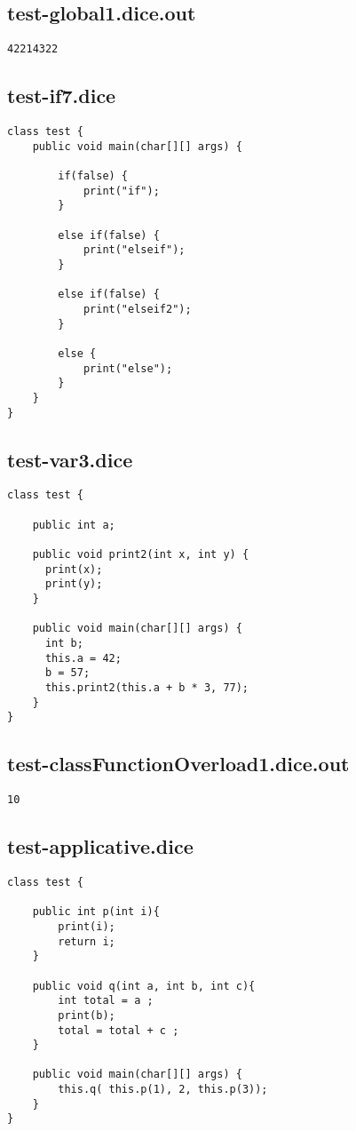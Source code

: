 \subsection{test-global1.dice.out}
\begin{verbatim}
42214322
\end{verbatim}
\pagebreak
\subsection{test-if7.dice}
\begin{verbatim}
class test {
	public void main(char[][] args) {

		if(false) { 
			print("if");
		} 
		
		else if(false) { 
			print("elseif"); 
		}

		else if(false) {
			print("elseif2");
		}

		else {
			print("else");
		}
	}
}
\end{verbatim}
\pagebreak
\subsection{test-var3.dice}
\begin{verbatim}
class test {

	public int a;

	public void print2(int x, int y) {
	  print(x);
	  print(y);
	}

	public void main(char[][] args) {
	  int b;
	  this.a = 42;
	  b = 57;
	  this.print2(this.a + b * 3, 77);
	}
}
\end{verbatim}
\pagebreak
\subsection{test-classFunctionOverload1.dice.out}
\begin{verbatim}
10
\end{verbatim}
\pagebreak
\subsection{test-applicative.dice}
\begin{verbatim}
class test {
	
	public int p(int i){ 
		print(i); 
		return i; 
	}

	public void q(int a, int b, int c){ 
		int total = a ; 
		print(b); 
		total = total + c ; 
	}
	
	public void main(char[][] args) {
		this.q( this.p(1), 2, this.p(3));
	}
}
\end{verbatim}
\pagebreak
